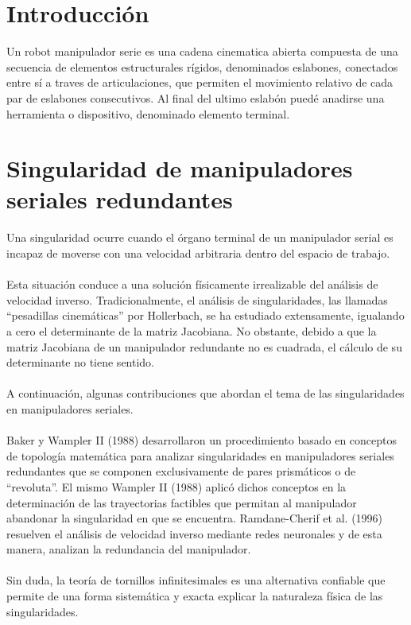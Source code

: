 \documentclass[12pt,a4paper]{article}
\begin{document}
\tableofcontents

\section{Introducción}
Un robot manipulador serie es una cadena cinematica abierta compuesta de una secuencia de elementos estructurales rígidos, denominados eslabones, conectados entre sí a traves de articulaciones, que permiten el movimiento relativo de cada par
de eslabones consecutivos. Al final del ultimo eslabón puedé anadirse una herramienta o dispositivo, denominado elemento terminal.\\

\section{Singularidad de manipuladores seriales redundantes
}
Una singularidad ocurre cuando el órgano terminal de un manipulador serial es incapaz de moverse con una velocidad arbitraria dentro del espacio de trabajo. \\\\
Esta situación conduce a una solución físicamente irrealizable del análisis de velocidad inverso. Tradicionalmente, el análisis de singularidades, las llamadas “pesadillas cinemáticas” por Hollerbach, se ha estudiado extensamente, igualando a cero el determinante de la matriz Jacobiana. No obstante, debido a que la matriz Jacobiana de un manipulador redundante no es cuadrada, el cálculo de su determinante no tiene sentido. \\\\
A continuación, algunas contribuciones que abordan el tema de las singularidades en manipuladores seriales. \\\\
Baker y Wampler II (1988) desarrollaron un procedimiento basado en conceptos de topología matemática para analizar singularidades en manipuladores seriales redundantes que se componen exclusivamente de pares prismáticos o de “revoluta”. El mismo Wampler II (1988) aplicó dichos conceptos en la determinación de las trayectorias factibles que permitan al manipulador abandonar la singularidad en que se encuentra. Ramdane-Cherif et al. (1996) resuelven el análisis de velocidad inverso mediante redes neuronales y de esta manera, analizan la redundancia del manipulador. \\\\
Sin duda, la teoría de tornillos infinitesimales es una alternativa confiable que permite de una forma sistemática y exacta explicar la naturaleza física de las singularidades. \\\\
\end{document}
